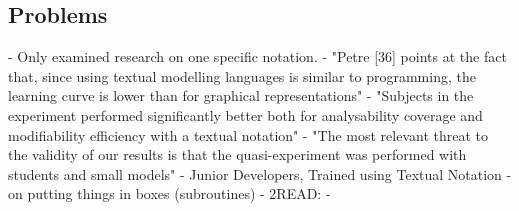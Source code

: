 \subsection{Problems}
- \autocite{melia_comparison_2016} Only examined research on one specific notation.
    - "Petre [36] points at the fact that, since using textual modelling languages is similar to programming, the learning curve is lower than for graphical representations" \autocite[3]{melia_comparison_2016}
    - "Subjects in the experiment performed significantly better both for analysability coverage and modifiability efficiency with a textual notation" \autocite[26]{melia_comparison_2016}
    - "The most relevant threat to the validity of our results is that the quasi-experiment was performed with students and small models" \autocite[26]{melia_comparison_2016}
    - Junior Developers, Trained using Textual Notation
- on putting things in boxes (subroutines) \autocite[23]{green_pictures_1982}
- 2READ: \autocite{bresciani_pitfalls_2015}
- \autocite{cook_unified_2017}
